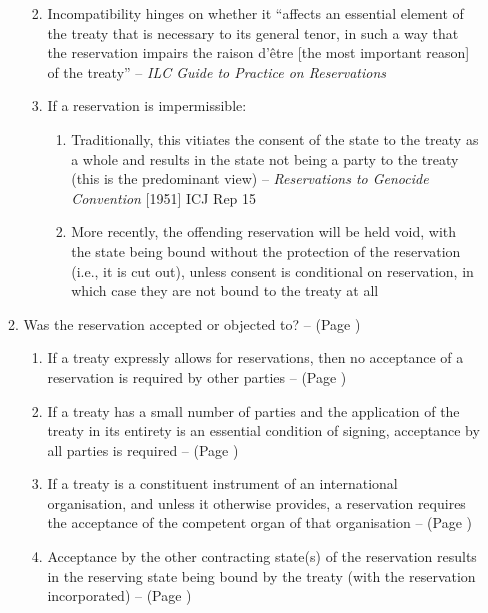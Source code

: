 \begin{enumerate}
\begin{enumerate}
\begin{enumerate}
\begin{enumerate}
            \end{enumerate}
            \item Incompatibility hinges on whether it “affects an essential element of the treaty that is necessary to its general tenor, in such a way that the reservation impairs the raison d'être [the most important reason] of the treaty” -- \textit{ILC Guide to Practice on Reservations}
            \item If a reservation is impermissible:
            \begin{enumerate}
                \item Traditionally, this vitiates the consent of the state to the treaty as a whole and results in the state not being a party to the treaty (this is the predominant view) -- \textit{Reservations to Genocide Convention} [1951] ICJ Rep 15
                \item More recently, the offending reservation will be held void, with the state being bound without the protection of the reservation (i.e., it is cut out), unless consent is conditional on reservation, in which case they are not bound to the treaty at all
            \end{enumerate}
        \end{enumerate}
        \item Was the reservation accepted or objected to? --  (Page \pageref{VCLT Art 20})
        \begin{enumerate}
            \item If a treaty expressly allows for reservations, then no acceptance of a reservation is required by other parties --  (Page \pageref{VCLT Art 20})
            \item If a treaty has a small number of parties and the application of the treaty in its entirety is an essential condition of signing, acceptance by all parties is required --  (Page \pageref{VCLT Art 20})
            \item If a treaty is a constituent instrument of an international organisation, and unless it otherwise provides, a reservation requires the acceptance of the competent organ of that organisation --  (Page \pageref{VCLT Art 20})
            \item Acceptance by the other contracting state(s) of the reservation results in the reserving state being bound by the treaty (with the reservation incorporated) --  (Page \pageref{VCLT Art 20})

\end{enumerate}
\end{enumerate}
\end{enumerate}
